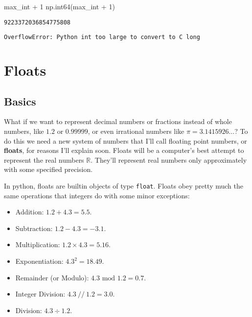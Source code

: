 \documentclass[
  letterpaper,
  DIV=11,
  numbers=noendperiod]{scrreprt}
\newenvironment{Shaded}{\begin{snugshade}}{\end{snugshade}}
\newcommand{\DecValTok}[1]{\textcolor[rgb]{0.68,0.00,0.00}{#1}}
\newcommand{\NormalTok}[1]{\textcolor[rgb]{0.00,0.23,0.31}{#1}}
\newcommand{\OperatorTok}[1]{\textcolor[rgb]{0.37,0.37,0.37}{#1}}
\providecommand{\tightlist}{%
  \setlength{\itemsep}{0pt}\setlength{\parskip}{0pt}}\usepackage{longtable,booktabs,array}
\begin{document}
\begin{Shaded}
\begin{Highlighting}[]
\NormalTok{max\_int }\OperatorTok{+} \DecValTok{1}
\NormalTok{np.int64(max\_int }\OperatorTok{+} \DecValTok{1}\NormalTok{)}
\end{Highlighting}
\end{Shaded}

\begin{verbatim}
9223372036854775808
\end{verbatim}

\begin{verbatim}
OverflowError: Python int too large to convert to C long
\end{verbatim}

\hypertarget{floats}{%
\section{Floats}\label{floats}}

\hypertarget{basics-1}{%
\subsection{Basics}\label{basics-1}}

What if we want to represent decimal numbers or fractions instead of
whole numbers, like \(1.2\) or \(0.99999\), or even irrational numbers
like \(\pi=3.1415926\dots\)? To do this we need a new system of numbers
that I'll call floating point numbers, or \textbf{floats}, for reasons
I'll explain soon. Floats will be a computer's best attempt to represent
the real numbers \(\mathbb{R}\). They'll represent real numbers only
approximately with some specified precision.

In python, floats are builtin objects of type \texttt{float}. Floats
obey pretty much the same operations that integers do with some minor
exceptions:

\begin{itemize}
\tightlist
\item
  Addition: \(1.2 + 4.3 = 5.5\).
\item
  Subtraction: \(1.2 - 4.3 = -3.1\).
\item
  Multiplication: \(1.2 \times 4.3 = 5.16\).
\item
  Exponentiation: \(4.3^2 = 18.49\).
\item
  Remainder (or Modulo): \(4.3 \text{ mod } 1.2 = 0.7\).
\item
  Integer Division: \(4.3 \ // \ 1.2 = 3.0\).
\item
  Division: \(4.3 \div 1.2\).
\end{itemize}
\end{document}
